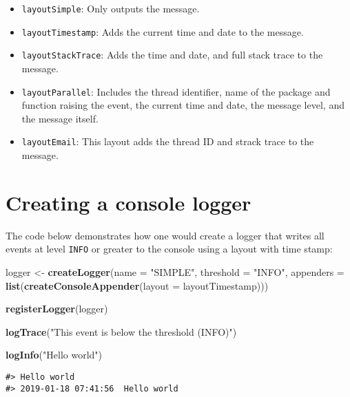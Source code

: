 \documentclass[]{article}
\newenvironment{Shaded}{\begin{snugshade}}{\end{snugshade}}
\newcommand{\DataTypeTok}[1]{\textcolor[rgb]{0.13,0.29,0.53}{#1}}
\newcommand{\KeywordTok}[1]{\textcolor[rgb]{0.13,0.29,0.53}{\textbf{#1}}}
\newcommand{\NormalTok}[1]{#1}
\newcommand{\StringTok}[1]{\textcolor[rgb]{0.31,0.60,0.02}{#1}}
\providecommand{\tightlist}{%
  \setlength{\itemsep}{0pt}\setlength{\parskip}{0pt}}
\begin{document}
\begin{itemize}
  \begin{itemize}
  \tightlist
  \item
    \texttt{layoutSimple}: Only outputs the message.
  \item
    \texttt{layoutTimestamp}: Adds the current time and date to the
    message.
  \item
    \texttt{layoutStackTrace}: Adds the time and date, and full stack
    trace to the message.
  \item
    \texttt{layoutParallel}: Includes the thread identifier, name of the
    package and function raising the event, the current time and date,
    the message level, and the message itself.
  \item
    \texttt{layoutEmail}: This layout adds the thread ID and strack
    trace to the message.
  \end{itemize}
\end{itemize}

\hypertarget{creating-a-console-logger}{%
\section{Creating a console logger}\label{creating-a-console-logger}}

The code below demonstrates how one would create a logger that writes
all events at level \texttt{INFO} or greater to the console using a
layout with time stamp:

\begin{Shaded}
\begin{Highlighting}[]
\NormalTok{logger <-}\StringTok{ }\KeywordTok{createLogger}\NormalTok{(}\DataTypeTok{name =} \StringTok{"SIMPLE"}\NormalTok{,}
                       \DataTypeTok{threshold =} \StringTok{"INFO"}\NormalTok{,}
                       \DataTypeTok{appenders =} \KeywordTok{list}\NormalTok{(}\KeywordTok{createConsoleAppender}\NormalTok{(}\DataTypeTok{layout =}\NormalTok{ layoutTimestamp)))}

\KeywordTok{registerLogger}\NormalTok{(logger)}

\KeywordTok{logTrace}\NormalTok{(}\StringTok{"This event is below the threshold (INFO)"}\NormalTok{)}

\KeywordTok{logInfo}\NormalTok{(}\StringTok{"Hello world"}\NormalTok{)}
\end{Highlighting}
\end{Shaded}

\begin{verbatim}
#> Hello world
#> 2019-01-18 07:41:56  Hello world
\end{verbatim}
\end{document}
